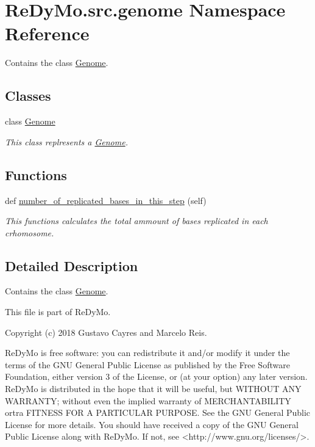 \hypertarget{namespaceReDyMo_1_1src_1_1genome}{}\section{Re\+Dy\+Mo.\+src.\+genome Namespace Reference}
\label{namespaceReDyMo_1_1src_1_1genome}


Contains the class \mbox{\hyperlink{classReDyMo_1_1src_1_1genome_1_1Genome}{Genome}}.  


\subsection*{Classes}
\begin{DoxyCompactItemize}
\item 
class \mbox{\hyperlink{classReDyMo_1_1src_1_1genome_1_1Genome}{Genome}}
\begin{DoxyCompactList}\small\item\em This class replresents a \mbox{\hyperlink{classReDyMo_1_1src_1_1genome_1_1Genome}{Genome}}. \end{DoxyCompactList}\end{DoxyCompactItemize}
\subsection*{Functions}
\begin{DoxyCompactItemize}
\item 
def \mbox{\hyperlink{namespaceReDyMo_1_1src_1_1genome_add11ea37fbc0e256164c4107d758b43b}{number\+\_\+of\+\_\+replicated\+\_\+bases\+\_\+in\+\_\+this\+\_\+step}} (self)
\begin{DoxyCompactList}\small\item\em This functions calculates the total ammount of bases replicated in each crhomosome. \end{DoxyCompactList}\end{DoxyCompactItemize}


\subsection{Detailed Description}
Contains the class \mbox{\hyperlink{classReDyMo_1_1src_1_1genome_1_1Genome}{Genome}}. 

\begin{DoxyVerb}This file is part of ReDyMo.

Copyright (c) 2018  Gustavo Cayres and Marcelo Reis.

ReDyMo is free software: you can redistribute it and/or modify it
under the terms of the GNU General Public License as published by the
Free Software Foundation, either version 3 of the License, or (at your
option) any later version.
ReDyMo is distributed in the hope that it will be useful, but WITHOUT
ANY WARRANTY; without even the implied warranty of MERCHANTABILITY ortra
FITNESS FOR A PARTICULAR PURPOSE. See the GNU General Public License
for more details.
You should have received a copy of the GNU General Public License along
with ReDyMo. If not, see <http://www.gnu.org/licenses/>.
\end{DoxyVerb}


